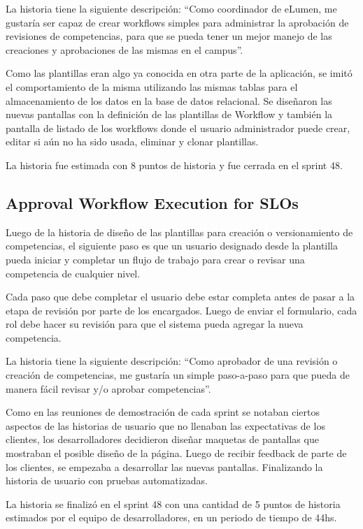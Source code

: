 La historia tiene la siguiente descripción: “Como coordinador de eLumen, me gustaría ser capaz de crear workflows simples para administrar la aprobación de revisiones de competencias, para que se pueda tener un mejor manejo de las creaciones y aprobaciones de las mismas en el campus”.

Como las plantillas eran algo ya conocida en otra parte de la aplicación, se imitó el comportamiento de la misma utilizando las mismas tablas para el almacenamiento de los datos en la base de datos relacional. Se diseñaron las nuevas pantallas con la definición de las plantillas de Workflow y también la pantalla de listado de los workflows donde el usuario administrador puede crear, editar si aún no ha sido usada, eliminar y clonar plantillas.

La historia fue estimada con 8 puntos de historia y fue cerrada en el sprint 48.

\subsection{Approval Workflow Execution for SLOs}
Luego de la historia de diseño de las plantillas para creación o versionamiento de competencias, el siguiente paso es que un usuario designado desde la plantilla pueda iniciar y completar un flujo de trabajo para crear o revisar una competencia de cualquier nivel.

Cada paso que debe completar el usuario debe estar completa antes de pasar a la etapa de revisión por parte de los encargados. Luego de enviar el formulario, cada rol debe hacer su revisión para que el sistema pueda agregar la nueva competencia.

La historia tiene la siguiente descripción: “Como aprobador de una revisión o creación de competencias, me gustaría un simple paso-a-paso para que pueda de manera fácil revisar y/o aprobar competencias”.

Como en las reuniones de demostración de cada sprint se notaban ciertos aspectos de las historias de usuario que no llenaban las expectativas de los clientes, los desarrolladores decidieron diseñar maquetas de pantallas que mostraban el posible diseño de la página. Luego de recibir feedback de parte de los clientes, se empezaba a desarrollar las nuevas pantallas. Finalizando la historia de usuario con pruebas automatizadas.

La historia se finalizó en el sprint 48 con una cantidad de 5 puntos de historia estimados por el equipo de desarrolladores, en un periodo de tiempo de 44hs.

